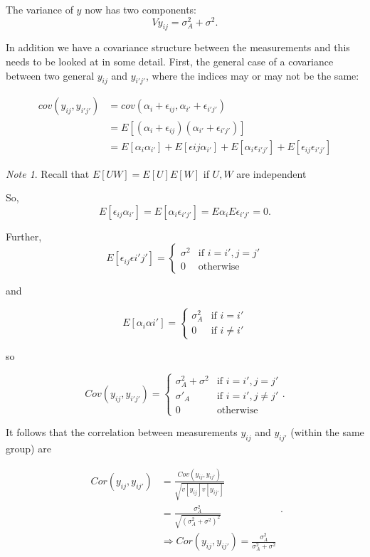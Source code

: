 \documentclass[12pt,a4paper]{article}
\theoremstyle{regla}
\theoremstyle{remark}
\newtheorem{notes}{Note}[section]
\theoremstyle{definition}
\theoremstyle{nonumberbreak}
\begin{document}
The variance of $y$ now has two components:
$$Vy_{ij}=\sigma^2_A + \sigma^2.$$


In addition we have a covariance structure between the measurements and this needs to be looked at in some detail. First, the general case of a covariance between two general $y_{ij}$ and $y_{i'j'}$, where the indices may or may not be the same:

\begin{eqnarray*}
cov(y_{ij},y_{i'j'}) &=cov(\alpha_i+\epsilon_{ij}, \alpha_{i'}+ \epsilon_{i'j'})\\
                     &=E[(\alpha_i+\epsilon_{ij})(\alpha_{i'}+\epsilon_{i'j'})]\\
                     &=E[\alpha_i\alpha_{i'}] + E[\epsilon{ij}\alpha_{i'}]+ E[\alpha_i\epsilon_{i'j'}] + E[\epsilon_{ij}\epsilon_{i'j'}]
\end{eqnarray*}

\begin{notes}
Recall that $E[UW]=E[U]E[W]$ if $U,W$ are independent
\end{notes}

So,
$$E[\epsilon_{ij}\alpha_{i'}]=E[\alpha_i\epsilon_{i'j'}] = E\alpha_iE\epsilon_{i'j'}=0 .$$

Further,
$$E[\epsilon_{ij}\epsilon{i'j'}] =
  \begin{cases}
  \sigma^2 & \text{if } i=i', j=j'\\
  0 &\text{otherwise} 
\end{cases}$$

and

$$ 
E[\alpha_{i}\alpha{i'}] =
\begin{cases}
\sigma^2_A &\text{if } i=i'\\
0 &\text{if }i \neq i' 
\end{cases}
$$

so

$$ Cov(y_{ij},y_{i'j'}) = 
\begin{cases}
  \sigma_A^2+\sigma^2 & \text{if } i=i', j=j'\\
  \sigma'_A & \text{if } i=i', j \neq j'\\
  0 & \text{otherwise}
\end{cases}. $$

It follows that the correlation between measurements $y_{ij}$ and $y_{ij'}$ (within the same group) are

$$
\begin{align*}
Cor(y_{ij},y_{ij'}) &= \frac{Cov(y_{ij},y_{ij'})}{\sqrt{v[y_{ij}]v[y_{ij'}]}}\\
                   &= \frac{\sigma_A^2}{\sqrt{(\sigma_A^2 + \sigma^2)^2}}\\
                   &\Rightarrow Cor(y_{ij}, y_{ij'}) = \frac{\sigma_A^2}{\sigma_A^2 + \sigma^2}
\end{align*}.
$$
\end{document}
